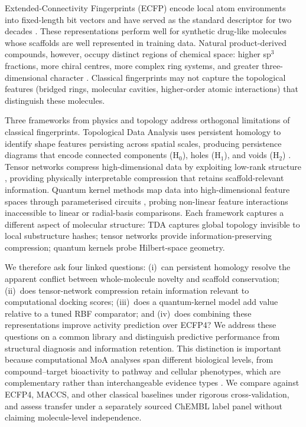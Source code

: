 \documentclass[11pt,a4paper]{article}
\begin{document}
Extended-Connectivity Fingerprints (ECFP) encode local atom environments into fixed-length bit vectors and have served as the standard descriptor for two decades \citep{ecfp_2010}. These representations perform well for synthetic drug-like molecules whose scaffolds are well represented in training data. Natural product-derived compounds, however, occupy distinct regions of chemical space: higher sp$^3$ fractions, more chiral centres, more complex ring systems, and greater three-dimensional character \citep{coconut_2021}. Classical fingerprints may not capture the topological features (bridged rings, molecular cavities, higher-order atomic interactions) that distinguish these molecules.

Three frameworks from physics and topology address orthogonal limitations of classical fingerprints. Topological Data Analysis uses persistent homology to identify shape features persisting across spatial scales, producing persistence diagrams that encode connected components (H$_0$), holes (H$_1$), and voids (H$_2$) \citep{tda_review_2025,tda_binding_affinity_2026,tda_pretraining_2026}. Tensor networks compress high-dimensional data by exploiting low-rank structure \citep{tensornet_2023,tn_efficient_2026}, providing physically interpretable compression that retains scaffold-relevant information. Quantum kernel methods map data into high-dimensional feature spaces through parameterised circuits \citep{qml_review_2026,pqc_chemistry_2026}, probing non-linear feature interactions inaccessible to linear or radial-basis comparisons. Each framework captures a different aspect of molecular structure: TDA captures global topology invisible to local substructure hashes; tensor networks provide information-preserving compression; quantum kernels probe Hilbert-space geometry.

We therefore ask four linked questions: (i)~can persistent homology resolve the apparent conflict between whole-molecule novelty and scaffold conservation; (ii)~does tensor-network compression retain information relevant to computational docking scores; (iii)~does a quantum-kernel model add value relative to a tuned RBF comparator; and (iv)~does combining these representations improve activity prediction over ECFP4? We address these questions on a common library and distinguish predictive performance from structural diagnosis and information retention. This distinction is important because computational MoA analyses span different biological levels, from compound--target bioactivity to pathway and cellular phenotypes, which are complementary rather than interchangeable evidence types \citep{Trapotsi2022MoA}. We compare against ECFP4, MACCS, and other classical baselines under rigorous cross-validation, and assess transfer under a separately sourced ChEMBL label panel without claiming molecule-level independence.
\end{document}
